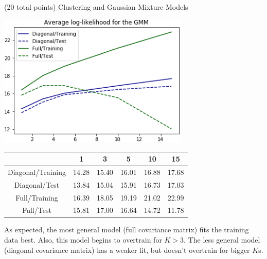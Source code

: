 \documentclass[12pt]{article}
\begin{document}
\begin{question}{(20 total points) Clustering and Gaussian Mixture Models}
\begin{subquestion}
      \begin{answerbox}{30em}
            \begin{center}
			\includegraphics[width=0.68\textwidth]{imgs/3_5.png}
			\begin{tabular}{|c|c|c|c|c|c|}

			\hline 
 & 1 & 3 & 5 & 10 & 15\\ \hline
Diagonal/Training & 14.28 & 15.40 & 16.01 & 16.88 & 17.68 \\ \hline
Diagonal/Test & 13.84 & 15.04 & 15.91 & 16.73 & 17.03 \\ \hline
Full/Training & 16.39 & 18.05 & 19.19 & 21.02 & 22.99 \\ \hline
Full/Test & 15.81 & 17.00 & 16.64 & 14.72 & 11.78 \\ \hline

			\end{tabular} 
		\end{center}
	As expected, the most general model (full covariance matrix) fits the training data best. Also, this model begins to overtrain for $K>3$. The less general model (diagonal covariance matrix) has a weaker fit, but doesn't overtrain for bigger $K$s.

      \end{answerbox}
  


   \end{subquestion}

   
\end{question}
\end{document}
